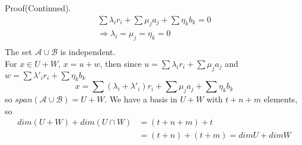 \documentclass[hyperref={pdfpagelabels=true}]{beamer}
\newcommand{\<}{\langle}
\renewcommand{\>}{\rangle}
\begin{document}
\begin{frame}
    \begin{block}{Proof(Continued).}
    \[
            \begin{aligned}
                \sum \lambda_{i} r_{i}+\sum \mu_{j} a_{j} +\sum \eta_{k} b_{k} = 0 \\
                \Rightarrow \lambda_{i} = \mu_{j} = \eta_{k} = 0 \\
            \end{aligned}
        \]
        The set $\mathcal{A} \cup \mathcal{B}$ is independent.\\
        For $x \in U+W$, $x = u + w$, then since $u = \sum \lambda_{i} r_{i} + \sum \mu_{j} a_{j}$ and $w = \sum \lambda'_{i} r_{i} + \sum \eta_{k} b_{k}$
        \[x = \sum (\lambda_{i}+\lambda'_{i})r_{i} + \sum \mu_{j} a_{j} + \sum \eta_{k} b_{k}\]
        so $span (\mathcal{A} \cup \mathcal{B}) = U + W$. We have a basis in $U+W$ with $t+n+m$ elements, so 
        \[
            \begin{aligned}
                dim(U+W) + dim(U \cap W) &= (t+n+m)+t \\
                &= (t+n)+(t+m) = dim U + dim W
            \end{aligned}
        \]
    \end{block}
\end{frame}
\end{document}
